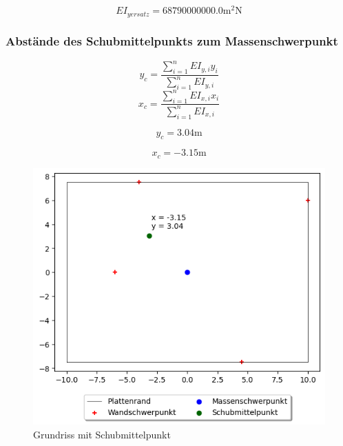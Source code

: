 \documentclass[
  letterpaper,
  DIV=11]{scrreprt}
\begin{document}
\begin{equation*}EI_{y ersatz} = 68790000000.0 \text{m}^{2} \text{N}\end{equation*}

\hypertarget{abstuxe4nde-des-schubmittelpunkts-zum-massenschwerpunkt}{%
\subsubsection{Abstände des Schubmittelpunkts zum
Massenschwerpunkt}\label{abstuxe4nde-des-schubmittelpunkts-zum-massenschwerpunkt}}

\[y_c = \frac{\sum_{i=1}^n EI_{y,i}y_i}{\sum_{i=1}^n EI_{y,i}}\]
\[x_c = \frac{\sum_{i=1}^n EI_{x,i}x_i}{\sum_{i=1}^n EI_{x,i}}\]

\begin{equation*}y_{c} = 3.04 \text{m}\end{equation*}

\begin{equation*}x_{c} = - 3.15 \text{m}\end{equation*}

\begin{figure}[H]

{\centering \includegraphics{U4_EKV_files/figure-pdf/fig-darstellung_berechnung-output-1.png}

}

\caption{\label{fig-darstellung_berechnung}Grundriss mit
Schubmittelpunkt}

\end{figure}
\end{document}
